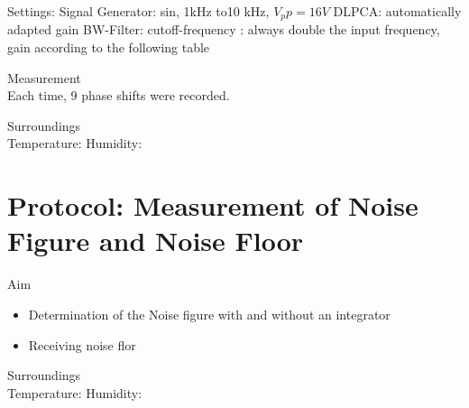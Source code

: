 Settings: \newline
Signal Generator:  sin, 1kHz to10 kHz, $V_pp=16V$
DLPCA:  automatically adapted gain
BW-Filter:  cutoff-frequency : always double the input frequency, gain according to the following table

\large{Measurement} \\
Each time, 9 phase shifts were recorded. 

\large{Surroundings} \\
Temperature: 
Humidity: 


\section{Protocol: Measurement of Noise Figure and Noise Floor}
\large{Aim} \\
\begin{itemize}
\item Determination of the Noise figure with and without an integrator
\item Receiving noise flor 
\end{itemize}

\large{Surroundings} \\
Temperature: 
Humidity: 